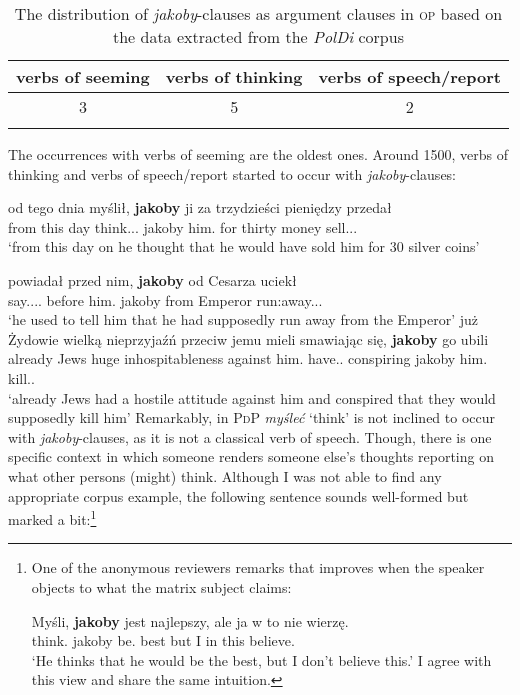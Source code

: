 \documentclass[output=paper
,modfonts
,nonflat]{langsci/langscibook}
\begin{document}
 \begin{table}[h]  \begin{tabular}{ccc} 
 \lsptoprule
verbs of seeming & verbs of thinking & verbs of speech\slash report \\
\midrule
3 & 5 & 2  \\
 \lspbottomrule
\end{tabular}
\caption{The distribution of \emph{jakoby}-clauses as argument clauses in \textsc{op} based on the data extracted from the \emph{PolDi} corpus} \label{staropolski_statystka_argument}
\end{table}

\noindent The occurrences with verbs of seeming are the oldest ones. Around 1500, verbs of thinking and verbs of speech\slash report started to occur with \emph{jakoby}-clauses:

\ea \gll od tego dnia myślił, \textbf{jakoby} ji za trzydzieści pieniędzy przedał \\
		from this day think.{\lptcp}.{\sg}.{\masc} jakoby him.{\acc} for thirty money sell.{\lptcp}.{\sg}.{\masc} \\
\glt	`from this day on he thought that he would have sold him for 30 silver coins' 
\z

\ea \ea \gll	powiadał przed nim, \textbf{jakoby} od Cesarza uciekł \\
		say.{\lptcp}.{\sg}.{\masc}.{\hab} before him.{\dat} jakoby from Emperor run:away.{\lptcp}.{\sg}.{\masc} \label{op_1} \\
	\glt	`he used to tell him that he had supposedly run away from the Emperor'  
	\ex\gll		  już Żydowie wielką nieprzyjaźń przeciw jemu mieli smawiając się, \textbf{jakoby} go ubili \label{op_2} \\
            already Jews huge inhospitableness against him.{\dat} have.{\lptcp}.{\vir} conspiring {} jakoby him.{\acc} kill.{\lptcp}.{\vir} \\
	\glt	`already Jews had a hostile attitude against him and conspired that they would supposedly kill him'         
    \z\z		
Remarkably, in \textsc{PdP} \emph{myśleć} `think' is not inclined to occur with \emph{jakoby}-clauses, as it is not a classical verb of speech. Though, there is one specific context in which someone renders someone else's thoughts reporting on what other persons (might) think. Although I was not able to find any appropriate corpus example, the following sentence sounds well-formed but marked a bit:\footnote{One of the anonymous reviewers remarks that  improves when the speaker objects to what the matrix subject claims:

\ea \gll Myśli, \textbf{jakoby} jest najlepszy, ale ja w to nie wierzę. \\
		think.{\thirdperson}{\sg} jakoby be.{\thirdperson}{\sg} best but I in this {\negation} believe.{\firstperson}{\sg} \\
\glt	 `He thinks that he would be the best, but I don't believe this.'
\z
I agree with this view and share the same intuition.
} 
\end{document}
